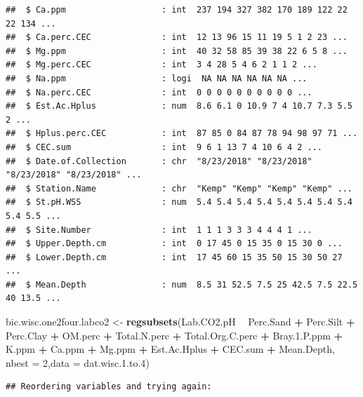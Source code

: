 \documentclass[]{article}
\newenvironment{Shaded}{\begin{snugshade}}{\end{snugshade}}
\newcommand{\DataTypeTok}[1]{\textcolor[rgb]{0.13,0.29,0.53}{#1}}
\newcommand{\DecValTok}[1]{\textcolor[rgb]{0.00,0.00,0.81}{#1}}
\newcommand{\FloatTok}[1]{\textcolor[rgb]{0.00,0.00,0.81}{#1}}
\newcommand{\KeywordTok}[1]{\textcolor[rgb]{0.13,0.29,0.53}{\textbf{#1}}}
\newcommand{\NormalTok}[1]{#1}
\newcommand{\OperatorTok}[1]{\textcolor[rgb]{0.81,0.36,0.00}{\textbf{#1}}}
\newcommand{\StringTok}[1]{\textcolor[rgb]{0.31,0.60,0.02}{#1}}
\begin{document}
\begin{verbatim}
##  $ Ca.ppm                   : int  237 194 327 382 170 189 122 22 22 134 ...
##  $ Ca.perc.CEC              : int  12 13 96 15 11 19 5 1 2 23 ...
##  $ Mg.ppm                   : int  40 32 58 85 39 38 22 6 5 8 ...
##  $ Mg.perc.CEC              : int  3 4 28 5 4 6 2 1 1 2 ...
##  $ Na.ppm                   : logi  NA NA NA NA NA NA ...
##  $ Na.perc.CEC              : int  0 0 0 0 0 0 0 0 0 0 ...
##  $ Est.Ac.Hplus             : num  8.6 6.1 0 10.9 7 4 10.7 7.3 5.5 2 ...
##  $ Hplus.perc.CEC           : int  87 85 0 84 87 78 94 98 97 71 ...
##  $ CEC.sum                  : int  9 6 1 13 7 4 10 6 4 2 ...
##  $ Date.of.Collection       : chr  "8/23/2018" "8/23/2018" "8/23/2018" "8/23/2018" ...
##  $ Station.Name             : chr  "Kemp" "Kemp" "Kemp" "Kemp" ...
##  $ St.pH.WSS                : num  5.4 5.4 5.4 5.4 5.4 5.4 5.4 5.4 5.4 5.5 ...
##  $ Site.Number              : int  1 1 1 3 3 3 4 4 4 1 ...
##  $ Upper.Depth.cm           : int  0 17 45 0 15 35 0 15 30 0 ...
##  $ Lower.Depth.cm           : int  17 45 60 15 35 50 15 30 50 27 ...
##  $ Mean.Depth               : num  8.5 31 52.5 7.5 25 42.5 7.5 22.5 40 13.5 ...
\end{verbatim}

\begin{Shaded}
\begin{Highlighting}[]
\NormalTok{bic.wisc.one2four.labco2 <-}\StringTok{ }\KeywordTok{regsubsets}\NormalTok{(Lab.CO2.pH }\OperatorTok{~}\StringTok{ }\NormalTok{Perc.Sand }\OperatorTok{+}\StringTok{ }\NormalTok{Perc.Silt }\OperatorTok{+}\StringTok{ }\NormalTok{Perc.Clay }\OperatorTok{+}\StringTok{ }\NormalTok{OM.perc }\OperatorTok{+}\StringTok{ }\NormalTok{Total.N.perc }\OperatorTok{+}\StringTok{ }\NormalTok{Total.Org.C.perc }\OperatorTok{+}\StringTok{ }\NormalTok{Bray.}\FloatTok{1.}\NormalTok{P.ppm }\OperatorTok{+}\StringTok{ }\NormalTok{K.ppm }\OperatorTok{+}\StringTok{ }\NormalTok{Ca.ppm }\OperatorTok{+}\StringTok{ }\NormalTok{Mg.ppm }\OperatorTok{+}\StringTok{ }\NormalTok{Est.Ac.Hplus }\OperatorTok{+}\StringTok{ }\NormalTok{CEC.sum }\OperatorTok{+}\StringTok{ }\NormalTok{Mean.Depth, }\DataTypeTok{nbest =} \DecValTok{2}\NormalTok{,}\DataTypeTok{data =}\NormalTok{ dat.wisc.}\FloatTok{1.}\NormalTok{to}\FloatTok{.4}\NormalTok{)}
\end{Highlighting}
\end{Shaded}

\begin{verbatim}
## Reordering variables and trying again:
\end{verbatim}
\end{document}
